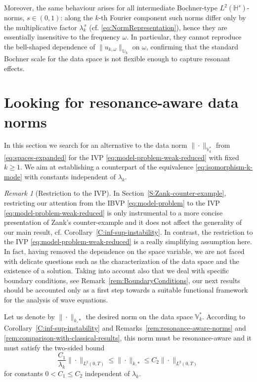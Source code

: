 \documentclass{amsart}
\theoremstyle{plain}
\theoremstyle{remark}
\newtheorem{remark}[theorem]{Remark}
\numberwithin{equation}{section}
\numberwithin{theorem}{section}
\newcommand{\trial}{\mathbb{U}}
\newcommand{\data}{\mathbb{V}^*}
\begin{document}
Moreover, the same behaviour arises for all intermediate Bochner-type $L^2(\mathbb H^s)$-norms, $s \in (0,1)$: along the $k$-th Fourier component such norms differ only by the multiplicative factor $\lambda_k^{\,s}$ (cf. \eqref{eq:NormRepresentation}), hence they are
essentially insensitive to the  frequency $\omega$. In particular, they
cannot reproduce the bell-shaped dependence of $\|u_{k,\omega}\|_{\trial_k}$ on
$\omega$, confirming that the standard Bochner scale for the data space is not flexible enough to
capture resonant effects.

\section{Looking for resonance-aware data norms}
\label{S:resonance-aware-norms} 
%
In this section we search for an alternative to the data norm $\|\cdot\|_{\data_k}$ from \eqref{eq:spaces-expanded} for the IVP \eqref{eq:model-problem-weak-reduced} with fixed $ k\geq 1$. We aim at establishing a counterpart of the equivalence \eqref{eq:isomorphism-k-mode} with constants independent of $\lambda_k$.

\begin{remark}[Restriction to the IVP]
	\label{rem:restriction-IVP}
In Section~\ref{S:Zank-counter-example}, restricting our attention from the IBVP \eqref{eq:model-problem} to the IVP \eqref{eq:model-problem-weak-reduced} is only instrumental to a more concise presentation of Zank's counter-example and it does not affect the generality of our main result, cf. Corollary~\ref{C:inf-sup-instability}. In contrast, the restriction to the IVP \eqref{eq:model-problem-weak-reduced} is a really simplifying assumption here. In fact, having removed the dependence on the space variable, we are not faced with delicate questions such as the characterization of the data space and the existence of a solution. Taking into account also that we deal with specific boundary conditions, see Remark~\ref{rem:BoundaryConditions}, our next results should be accounted only as a first step towards a suitable functional framework for the analysis of wave equations.
\end{remark}

Let us denote by $\|\cdot\|_{k,*}$ the desired norm on the data space $\data_k$. According to Corollary~\ref{C:inf-sup-instability} and Remarks~\ref{rem:resonance-aware-norms} and \ref{rem:comparison-with-classical-results}, this norm must be resonance-aware and it must satisfy the two-sided bound
\[
\frac{C_1}{\lambda_k} \|\cdot\|_{L^2(0,T)} \leq \|\cdot\|_{k, *} \leq C_2\|\cdot\|_{L^2(0,T)} 
\] 
for constants $0 < C_1 \leq C_2$ independent of $\lambda_k$.
\end{document}
